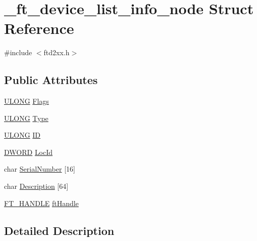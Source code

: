 \hypertarget{struct__ft__device__list__info__node}{}\section{\+\_\+ft\+\_\+device\+\_\+list\+\_\+info\+\_\+node Struct Reference}
\label{struct__ft__device__list__info__node}


{\ttfamily \#include $<$ftd2xx.\+h$>$}

\subsection*{Public Attributes}
\begin{DoxyCompactItemize}
\item 
\hyperlink{CatCaloProto40MHz_2inc_2WinTypes_8h_af632da489ebc3708ec3ab6791ee53fa4}{U\+L\+O\+NG} \hyperlink{struct__ft__device__list__info__node_a721b47fa89702eff50b231f17c4298e6}{Flags}
\item 
\hyperlink{CatCaloProto40MHz_2inc_2WinTypes_8h_af632da489ebc3708ec3ab6791ee53fa4}{U\+L\+O\+NG} \hyperlink{struct__ft__device__list__info__node_aa764a1406eb904ad4444a82f2f950b4e}{Type}
\item 
\hyperlink{CatCaloProto40MHz_2inc_2WinTypes_8h_af632da489ebc3708ec3ab6791ee53fa4}{U\+L\+O\+NG} \hyperlink{struct__ft__device__list__info__node_a6f486d775e8b49190ec48e99cdbdcbe5}{ID}
\item 
\hyperlink{CatCaloProto40MHz_2inc_2WinTypes_8h_ad342ac907eb044443153a22f964bf0af}{D\+W\+O\+RD} \hyperlink{struct__ft__device__list__info__node_a11f8898a6bc9a91abadb14c02cac4394}{Loc\+Id}
\item 
char \hyperlink{struct__ft__device__list__info__node_a833aa1d16c8e1034840397921ae92413}{Serial\+Number} \mbox{[}16\mbox{]}
\item 
char \hyperlink{struct__ft__device__list__info__node_a2ed17bec72cbe5e73a2e83cd29a8e681}{Description} \mbox{[}64\mbox{]}
\item 
\hyperlink{LALUsbMLx64_2include_2ftd2xx_8h_a6b3b6700c4c65514ae24fee3d5bb2908}{F\+T\+\_\+\+H\+A\+N\+D\+LE} \hyperlink{struct__ft__device__list__info__node_a3a26fc5e6180c4f87dec4ebf1951d100}{ft\+Handle}
\end{DoxyCompactItemize}


\subsection{Detailed Description}


